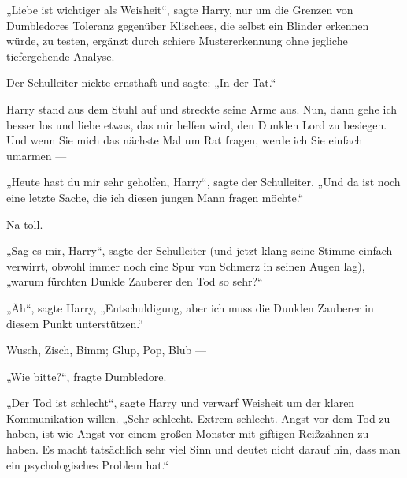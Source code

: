 „Liebe ist wichtiger als Weisheit“, sagte Harry, nur um die Grenzen von Dumbledores Toleranz gegenüber Klischees, die selbst ein Blinder erkennen würde, zu testen, ergänzt durch schiere Mustererkennung ohne jegliche tiefergehende Analyse.

Der Schulleiter nickte ernsthaft und sagte:
„In der Tat.“

Harry stand aus dem Stuhl auf und streckte seine Arme aus. Nun, dann gehe ich besser los und liebe etwas, das mir helfen wird, den Dunklen Lord zu besiegen. Und wenn Sie mich das nächste Mal um Rat fragen, werde ich Sie einfach umarmen —

„Heute hast du mir sehr geholfen, Harry“, sagte der Schulleiter.
„Und da ist noch eine letzte Sache, die ich diesen jungen Mann fragen möchte.“

Na toll.

„Sag es mir, Harry“, sagte der Schulleiter (und jetzt klang seine Stimme einfach verwirrt, obwohl immer noch eine Spur von Schmerz in seinen Augen lag), „warum fürchten Dunkle Zauberer den Tod so sehr?“

„Äh“, sagte Harry,
„Entschuldigung, aber ich muss die Dunklen Zauberer in diesem Punkt unterstützen.“

\later

Wusch, Zisch, Bimm; Glup, Pop, Blub —

„Wie bitte?“, fragte Dumbledore.

„Der Tod ist schlecht“, sagte Harry und verwarf Weisheit um der klaren Kommunikation willen.
„Sehr schlecht. Extrem schlecht. Angst vor dem Tod zu haben, ist wie Angst vor einem großen Monster mit giftigen Reißzähnen zu haben. Es macht tatsächlich sehr viel Sinn und deutet nicht darauf hin, dass man ein psychologisches Problem hat.“


